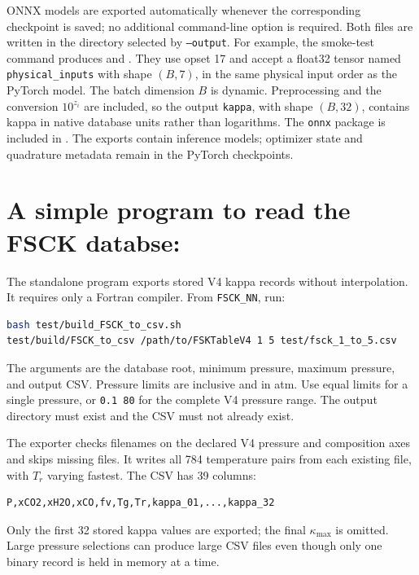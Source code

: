\documentclass[11pt,letterpaper]{article}
\begin{document}
ONNX models are exported automatically whenever the corresponding checkpoint
is saved; no additional command-line option is required. Both files are
written in the directory selected by \texttt{--output}. For example, the
smoke-test command produces  and
. They use opset 17 and accept a float32 tensor named
\texttt{physical\_inputs} with shape $(B,7)$, in the same physical input order
as the PyTorch model. The batch dimension $B$ is dynamic. Preprocessing and
the conversion $10^{z_i}$ are included, so the output \texttt{kappa}, with
shape $(B,32)$, contains kappa in native database units rather than logarithms.
The \texttt{onnx} package is included in .
The exports contain inference models; optimizer state and quadrature metadata
remain in the PyTorch checkpoints.


\section{A simple program to read the FSCK databse:}
The standalone program  exports stored V4 kappa
records without interpolation. It requires only a Fortran compiler. From \texttt{FSCK\_NN}, run:
\begin{lstlisting}[language=bash]
bash test/build_FSCK_to_csv.sh
test/build/FSCK_to_csv /path/to/FSKTableV4 1 5 test/fsck_1_to_5.csv
\end{lstlisting}
The arguments are the database root, minimum pressure, maximum pressure,
and output CSV. Pressure limits are inclusive and in atm. Use equal limits
for a single pressure, or \texttt{0.1 80} for the complete V4 pressure range.
The output directory must exist and the CSV must not already exist.

The exporter checks filenames on the declared V4 pressure and composition
axes and skips missing files. It writes all 784 temperature pairs from each
existing file, with $T_r$ varying fastest. The CSV has 39 columns:
\begin{lstlisting}
P,xCO2,xH2O,xCO,fv,Tg,Tr,kappa_01,...,kappa_32
\end{lstlisting}
Only the first 32 stored kappa values are exported; the final
$\kappa_{\max}$ is omitted. Large pressure
selections can produce large CSV files even though only one binary record
is held in memory at a time.
\end{document}
